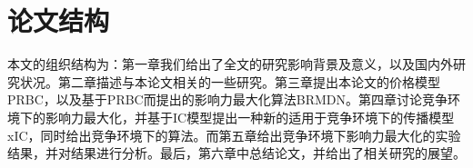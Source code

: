 \section{论文结构}
本文的组织结构为：第一章我们给出了全文的研究影响背景及意义，以及国内外研究状况。第二章描述与本论文相关的一些研究。第三章提出本论文的价格模型PRBC，以及基于PRBC而提出的影响力最大化算法BRMDN。第四章讨论竞争环境下的影响力最大化，并基于IC模型提出一种新的适用于竞争环境下的传播模型xIC，同时给出竞争环境下的算法。而第五章给出竞争环境下影响力最大化的实验结果，并对结果进行分析。最后，第六章中总结论文，并给出了相关研究的展望。